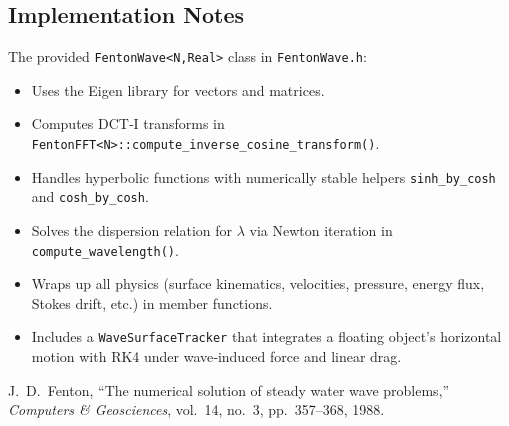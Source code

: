 \documentclass{article}
\begin{document}
\subsection{Implementation Notes}

The provided \verb|FentonWave<N,Real>| class in \texttt{FentonWave.h}:
\begin{itemize}
  \item Uses the Eigen library for vectors and matrices.
  \item Computes DCT‐I transforms in \verb|FentonFFT<N>::compute_inverse_cosine_transform()|.
  \item Handles hyperbolic functions with numerically stable helpers \verb|sinh_by_cosh| and \verb|cosh_by_cosh|.
  \item Solves the dispersion relation for $\lambda$ via Newton iteration in \verb|compute_wavelength()|.
  \item Wraps up all physics (surface kinematics, velocities, pressure, energy flux, Stokes drift, etc.) in member functions.
  \item Includes a \verb|WaveSurfaceTracker| that integrates a floating object’s horizontal motion with RK4 under wave‐induced force and linear drag.
\end{itemize}

\begin{thebibliography}{1}
J.~D.~Fenton, “The numerical solution of steady water wave problems,” \emph{Computers \& Geosciences}, vol.~14, no.~3, pp.~357–368, 1988.
\end{thebibliography}
\end{document}
